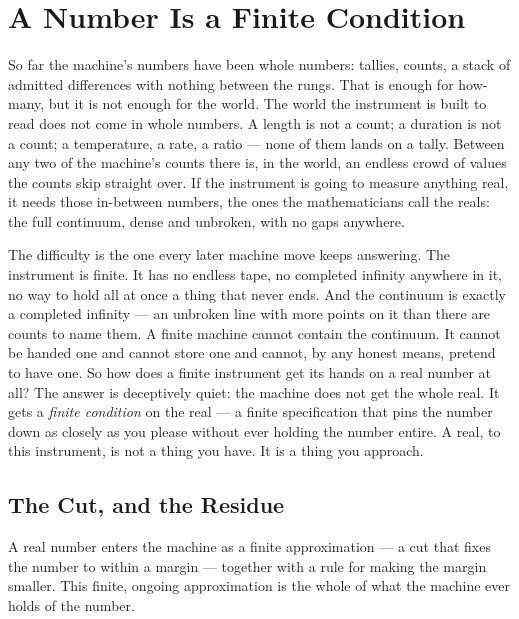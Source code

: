 \chapter{A Number Is a Finite Condition}

So far the machine's numbers have been whole numbers: tallies, counts, a stack of admitted differences with
nothing between the rungs. That is enough for how-many, but it is not enough for the world. The world the
instrument is built to read does not come in whole numbers. A length is not a count; a duration is not a count; a
temperature, a rate, a ratio --- none of them lands on a tally. Between any two of the machine's counts there is,
in the world, an endless crowd of values the counts skip straight over. If the instrument is going to measure
anything real, it needs those in-between numbers, the ones the mathematicians call the reals: the full continuum,
dense and unbroken, with no gaps anywhere.

The difficulty is the one every later machine move keeps answering. The instrument is finite. It has no endless
tape, no completed infinity anywhere in it, no way to hold all at once a thing that never ends. And the continuum
is exactly a completed infinity --- an unbroken line with more points on it than there are counts to name them. A
finite machine cannot contain the continuum. It cannot be handed one and cannot store one and cannot, by any
honest means, pretend to have one. So how does a finite instrument get its hands on a real number at all? The
answer is deceptively quiet: the machine does not get the whole real. It gets a \emph{finite condition} on the
real --- a finite specification that pins the number down as closely as you please without ever holding the
number entire. A real, to this instrument, is not a thing you have. It is a thing you approach.

\section{The Cut, and the Residue}

A real number enters the machine as a finite approximation --- a cut that fixes the number to within a margin ---
together with a rule for making the margin smaller. This finite, ongoing approximation is the whole of what the
machine ever holds of the number.

